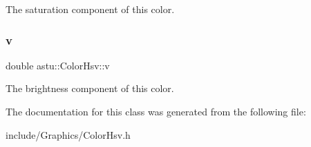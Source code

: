 The saturation component of this color. \mbox{\label{classastu_1_1ColorHsv_a05e185fc6498318cb461941a8ca40ec2}} 
\subsubsection{\texorpdfstring{v}{v}}
{\footnotesize\ttfamily double astu\+::\+Color\+Hsv\+::v}

The brightness component of this color. 

The documentation for this class was generated from the following file\+:\begin{DoxyCompactItemize}
\item 
include/\+Graphics/Color\+Hsv.\+h\end{DoxyCompactItemize}
